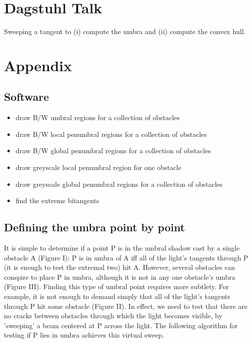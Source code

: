 \documentclass[9pt]{article}
\newif\ifJournal
\begin{document}

\ifJournal
\section{Dagstuhl Talk}

Sweeping a tangent to (i) compute the umbra and (ii) compute the convex hull.

\section{Appendix}
\label{sec:appendix}

\subsection{Software}

\begin{itemize}
\item draw B/W umbral regions for a collection of obstacles
\item draw B/W local penumbral regions for a collection of obstacles
\item draw B/W global penumbral regions for a collection of obstacles 
\item draw greyscale local penumbral region for one obstacle
\item draw greyscale global penumbral regions for a collection of obstacles
\item find the extreme bitangents
\end{itemize}

\subsection{Defining the umbra point by point}
\label{sec:local}

It is simple to determine if a point P is in the umbral shadow cast by a 
single obstacle A (Figure I):
P is in umbra of A iff all of the light's tangents through P (it is enough to test
the extremal two) hit A.
However, several obstacles can conspire to place P in umbra, although it is not
in any one obstacle's umbra (Figure III).
Finding this type of umbral point requires more subtlety.
For example, it is not enough to demand simply that all of the light's tangents through P
hit some obstacle (Figure II).
In effect, we need to test that there are no cracks between obstacles through which
the light becomes visible, by 'sweeping' a beam centered at P across the light.
The following algorithm for testing if P lies in umbra achieves this virtual sweep.
\end{document}
